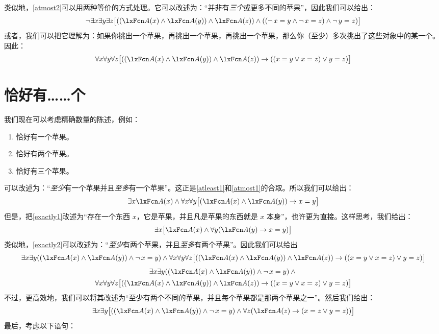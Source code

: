 类似地，\cref*{atmost2}可以用两种等价的方式处理。它可以改述为：“并非有\emph{三个}或更多不同的苹果”，因此我们可以给出：
\[
	\enot \exists x \exists y\exists z\bigl[((\atom{A}{x} \eand \atom{A}{y}) \eand \atom{A}{z}) \eand ((\enot\, {x = y} \eand \enot\, {x = z}) \eand \enot\, {y = z})\bigr]
\]
或者，我们可以把它理解为：如果你挑出一个苹果，再挑出一个苹果，再挑出一个苹果，那么你（至少）多次挑出了这些对象中的某一个。因此：
\[
	\forall x\forall y\forall z\bigl[((\atom{A}{x} \eand \atom{A}{y}) \eand \atom{A}{z}) \eif ((x=y \eor x=z) \eor y=z)\bigr]
\]

\section{恰好有……个}\label{sec:exactlyn}

我们现在可以考虑精确数量的陈述，例如：


\begin{enumerate}
\item\label{exactly1} 恰好有一个苹果。
\item\label{exactly2} 恰好有两个苹果。
\item\label{exactly3} 恰好有三个苹果。
\end{enumerate}


可以改述为：“\emph{至少}有一个苹果并且\emph{至多}有一个苹果”。这正是\cref{atleast1}和\cref{atmost1}的合取。所以我们可以给出：
\[
	\exists x \atom{A}{x} \eand \forall x\forall y\bigl[(\atom{A}{x} \eand \atom{A}{y}) \eif x=y\bigr]
\]
但是，把\cref*{exactly1}改述为“存在一个东西 $x$，它是苹果，并且凡是苹果的东西就是 $x$ 本身”，也许更为直接。这样思考，我们给出：
\[
	\exists x\bigl[\atom{A}{x} \eand \forall y(\atom{A}{y} \eif x= y)\bigr]
\]
类似地，\cref*{exactly2}可以改述为：“\emph{至少}有两个苹果，并且\emph{至多}有两个苹果”。因此我们可以给出
\ifHTMLtarget
\[\exists x \exists y((\atom{A}{x} \eand \atom{A}{y}) \eand \enot\, {x = y}) \eand
\forall x\forall y\forall z\bigl[((\atom{A}{x} \eand \atom{A}{y})
\eand \atom{A}{z}) \eif ((x=y \eor x=z) \eor y=z)\bigr]
\]
\else
\begin{multline*}
  \exists x \exists y((\atom{A}{x} \eand \atom{A}{y}) \eand \enot\, {x = y}) \eand {}\\
  \forall x\forall y\forall z\bigl[((\atom{A}{x} \eand \atom{A}{y}) \eand \atom{A}{z}) \eif ((x=y \eor x=z) \eor y=z)\bigr]
\end{multline*}
\fi
不过，更高效地，我们可以将其改述为“至少有两个不同的苹果，并且每个苹果都是那两个苹果之一”。然后我们给出：
$$\exists x\exists y\bigl[((\atom{A}{x} \eand \atom{A}{y}) \eand \enot\, {x = y}) \eand \forall z(\atom{A}{z} \eif ( x= z \eor y = z))\bigr]$$
最后，考虑以下语句：


